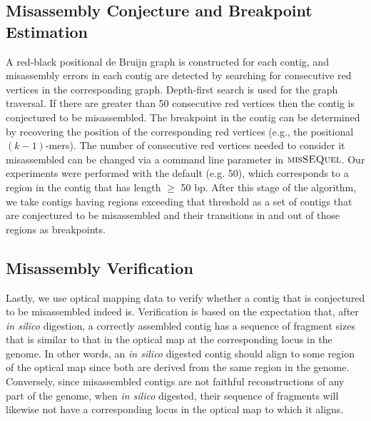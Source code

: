 \subsection{Misassembly Conjecture and Breakpoint Estimation}  

A red-black positional de Bruijn graph is constructed for each contig, and misassembly errors in each contig are detected by searching for consecutive red vertices in the corresponding graph.  Depth-first search is used for the graph traversal. If there are greater than 50 consecutive red vertices then the contig is conjectured to be misassembled.  The breakpoint in the contig can be determined by recovering the position of the corresponding red vertices (e.g., the positional $(k - 1)$-mers).  The number of consecutive red vertices needed to consider it misassembled can be changed via a command line parameter in $\mbox{\rm {\sc misSEQuel}}$.  Our experiments were performed with the default (e.g. 50), which corresponds to a region in the contig that has length $\geq$ 50 bp.  After this stage of the algorithm, we take contigs having regions exceeding that threshold as a set of contigs that are conjectured to be misassembled and their transitions in and out of those regions as breakpoints.

\subsection{Misassembly Verification} \label{dev}

Lastly, we use optical mapping data to verify whether a contig that is conjectured to be misassembled indeed is.  
Verification is based on the expectation that, after {\em in silico} digestion, a correctly assembled contig has a sequence of fragment sizes that is similar to that in the optical map at the corresponding locus in the genome.  In other words, an {\em in silico} digested contig should align to some region of the optical map since both are derived from the same region in the genome.
Conversely, since misassembled contigs are not faithful reconstructions of any part of the genome, when {\em in silico} digested, their sequence of fragments will likewise not have a corresponding locus in the optical map to which it aligns.  

